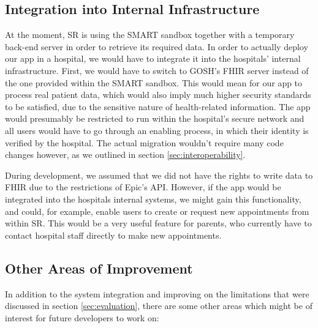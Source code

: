 \documentclass[sigconf]{acmart}
\begin{document}
\subsection{Integration into Internal Infrastructure}
At the moment, SR is using the SMART sandbox together with a temporary back-end server in order to retrieve its required data. In order to actually deploy our app in a hospital, we would have to integrate it into the hospitals' internal infrastructure. First, we would have to switch to GOSH's FHIR server instead of the one provided within the SMART sandbox. This would mean for our app to process real patient data, which would also imply much higher security standards to be satisfied, due to the sensitive nature of health-related information. The app would presumably be restricted to run within the hospital's secure network and all users would have to go through an enabling process, in which their identity is verified by the hospital. The actual migration wouldn't require many code changes however, as we outlined in section \ref{sec:interoperability}.

During development, we assumed that we did not have the rights to write data to FHIR due to the restrictions of Epic's API. However, if the app would be integrated into the hospitals internal systems, we might gain this functionality, and could, for example, enable users to create or request new appointments from within SR. This would be a very useful feature for parents, who currently have to contact hospital staff directly to make new appointments.


\subsection{Other Areas of Improvement}

In addition to the system integration and improving on the limitations that were discussed in section \ref{sec:evaluation}, there are some other areas which might be of interest for future developers to work on:
\end{document}
